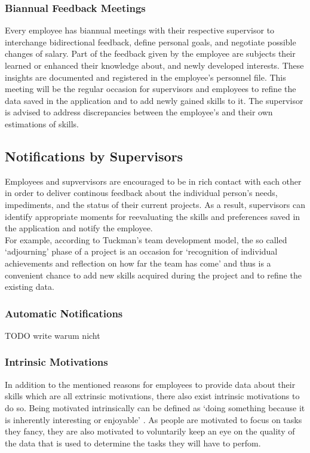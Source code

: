\subsubsection{Biannual Feedback Meetings}
Every employee has biannual meetings with their respective supervisor to interchange
bidirectional feedback, define personal goals, and negotiate possible changes of salary.
Part of the feedback given by the employee are subjects their learned or enhanced their knowledge about, and newly developed interests. These insights are documented and registered in the employee's personnel file.
This meeting will be the regular occasion for supervisors and employees to refine the data saved in the application and to add
newly gained skills to it. The supervisor is advised to address discrepancies between the employee's and their own estimations of skills.

\subsection{Notifications by Supervisors}
Employees and supvervisors are encouraged to be in rich contact with each other in order to deliver continous feedback
about the individual person's needs, impediments, and the status of their current projects.
As a result, supervisors can identify appropriate moments for reevaluating the skills and preferences saved in the application and notify the employee.\\
For example, according to Tuckman's team development model, the so called `adjourning' phase of a project is an occasion for `recognition of individual achievements and reflection on how far the team has come' \cite[P. 3]{Wilson} and thus is a convenient chance to add new skills acquired during the project and to refine the existing data.

\subsubsection{Automatic Notifications}
TODO write warum nicht

\subsubsection{Intrinsic Motivations}
In addition to the mentioned reasons for employees to provide data about their skills which are all extrinsic motivations,
there also exist intrinsic motivations to do so. Being motivated intrinsically can be defined as `doing something because it is inherently interesting or enjoyable' \cite{RYAN200054}. As people are motivated to focus on tasks they fancy, they are also motivated to voluntarily keep an eye on the quality of the data that is used to determine the tasks they will have to perfom.









